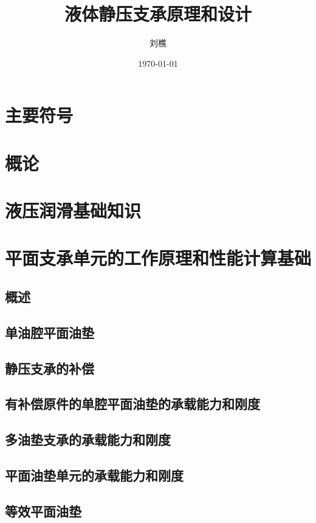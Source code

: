 \documentclass[UTF8, 12pt]{ctexbook}
\title{液体静压支承原理和设计}
\author{刘樵}
\date{\today}
\begin{document}
\maketitle
\tableofcontents

\chapter*{主要符号}
\chapter{概论}
\chapter{液压润滑基础知识}
\chapter{平面支承单元的工作原理和性能计算基础}
\section{概述}
\section{单油腔平面油垫}
\section{静压支承的补偿}
\section{有补偿原件的单腔平面油垫的承载能力和刚度}
\section{多油垫支承的承载能力和刚度}
\section{平面油垫单元的承载能力和刚度}
\section{等效平面油垫}
\end{document}
